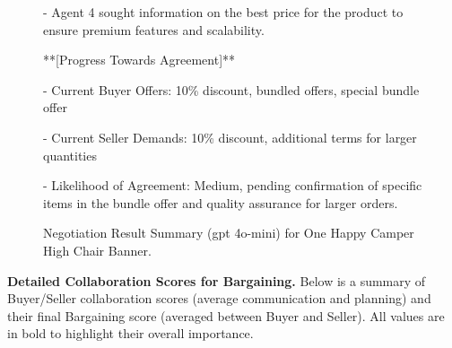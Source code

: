 \begin{figure}[htbp]
\begin{tcolorbox}[colback=orange!2!white, colframe=gray!50!orange]
\begin{minipage}{\linewidth}
- Agent 4 sought information on the best price for the product to ensure premium features and scalability.

**[Progress Towards Agreement]**

- Current Buyer Offers: 10\% discount, bundled offers, special bundle offer

- Current Seller Demands: 10\% discount, additional terms for larger quantities

- Likelihood of Agreement: Medium, pending confirmation of specific items in the bundle offer and quality assurance for larger orders.

  
\end{minipage}
\end{tcolorbox}
\caption{Negotiation Result Summary (gpt 4o-mini) for One Happy Camper High Chair Banner.}
\label{fig:negotiation-summary}
\end{figure}
\noindent
\textbf{Detailed Collaboration Scores for Bargaining.} Below is a summary of Buyer/Seller collaboration scores (average communication and planning) and their final Bargaining score (averaged between Buyer and Seller). All values are in bold to highlight their overall importance.

\begin{table}[htbp]
\centering
{}
\caption{Buyer and Seller detailed scores (Communication, Planning, and their Collab average), plus the Final Bargaining Score for each model.}
\label{tab:appendix_bargaining_full}
\end{table}

